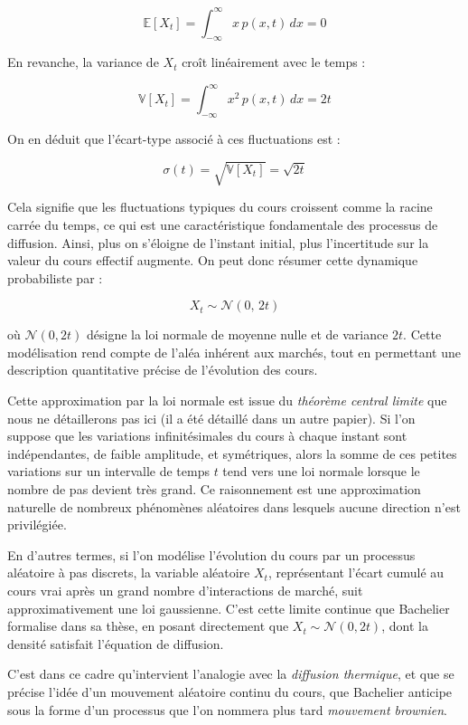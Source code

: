 \documentclass[12pt,a4paper]{article}
\begin{document}
\[
\mathbb{E}[X_t] = \int_{-\infty}^{\infty} x\, p(x,t)\, dx = 0
\]

En revanche, la variance de \( X_t \) croît linéairement avec le temps :

\[
\mathbb{V}[X_t] = \int_{-\infty}^{\infty} x^2\, p(x,t)\, dx = 2t
\]

On en déduit que l’écart-type associé à ces fluctuations est :

\[
\sigma(t) = \sqrt{\mathbb{V}[X_t]} = \sqrt{2t}
\]

Cela signifie que les fluctuations typiques du cours croissent comme la racine carrée du temps, ce qui est une caractéristique fondamentale des processus de diffusion. Ainsi, plus on s’éloigne de l’instant initial, plus l’incertitude sur la valeur du cours effectif augmente. On peut donc résumer cette dynamique probabiliste par :

\[
X_t \sim \mathcal{N}(0,\, 2t)
\]

où \( \mathcal{N}(0, 2t) \) désigne la loi normale de moyenne nulle et de variance \( 2t \). Cette modélisation rend compte de l’aléa inhérent aux marchés, tout en permettant une description quantitative précise de l’évolution des cours.

Cette approximation par la loi normale est issue du \textit{théorème central limite} que nous ne détaillerons pas ici (il a été détaillé dans un autre papier). Si l’on suppose que les variations infinitésimales du cours à chaque instant sont indépendantes, de faible amplitude, et symétriques, alors la somme de ces petites variations sur un intervalle de temps \( t \) tend vers une loi normale lorsque le nombre de pas devient très grand. Ce raisonnement est une approximation naturelle de nombreux phénomènes aléatoires dans lesquels aucune direction n’est privilégiée.

En d’autres termes, si l’on modélise l’évolution du cours par un processus aléatoire à pas discrets, la variable aléatoire \( X_t \), représentant l’écart cumulé au cours vrai après un grand nombre d’interactions de marché, suit approximativement une loi gaussienne. C’est cette limite continue que Bachelier formalise dans sa thèse, en posant directement que \( X_t \sim \mathcal{N}(0, 2t) \), dont la densité satisfait l’équation de diffusion.

\bigskip

C’est dans ce cadre qu’intervient l’analogie avec la \textit{diffusion thermique}, et que se précise l’idée d’un mouvement aléatoire continu du cours, que Bachelier anticipe sous la forme d’un processus que l’on nommera plus tard \textit{mouvement brownien}.
\end{document}
